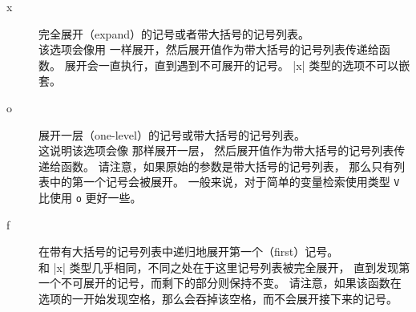 \documentclass[full]{l3doc}
\begin{document}
\begin{description}
    \item[x] 完全展开（expand）的记号或者带大括号的记号列表。\\
    该选项会像用  一样展开，然后展开值作为带大括号的记号列表传递给函数。
    展开会一直执行，直到遇到不可展开的记号。
    |x| 类型的选项不可以嵌套。
    \item[o] 展开一层（one-level）的记号或带大括号的记号列表。\\
    这说明该选项会像  那样展开一层，
    然后展开值作为带大括号的记号列表传递给函数。
    请注意，如果原始的参数是带大括号的记号列表，
    那么只有列表中的第一个记号会被展开。
    一般来说，对于简单的变量检索使用类型 \texttt{V} 比使用 \texttt{o} 更好一些。
    \item[f] 在带有大括号的记号列表中递归地展开第一个（first）记号。\\
    和 |x| 类型几乎相同，不同之处在于这里记号列表被完全展开，
    直到发现第一个不可展开的记号，而剩下的部分则保持不变。
    请注意，如果该函数在选项的一开始发现空格，那么会吞掉该空格，而不会展开接下来的记号。
\end{description}

%
\end{document}
